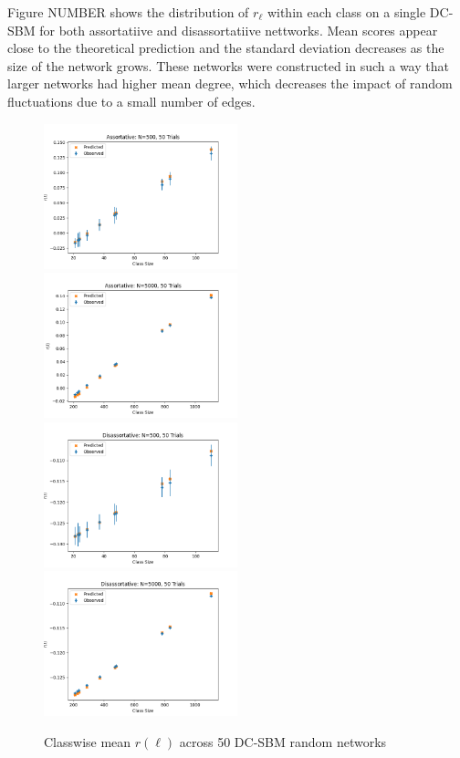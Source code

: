 \documentclass[12pt]{article}
\begin{document}
Figure NUMBER shows the distribution of $r_\ell$ within each class on a single DC-SBM for both assortatiive and disassortatiive nettworks.  Mean scores appear close to the theoretical prediction and the standard deviation decreases as the size of the network grows.  These networks were constructed in such a way that larger networks had higher mean degree, which decreases the impact of random fluctuations due to a small number of edges.  

\begin{figure}[h!]
\includegraphics[width=0.5\textwidth]{assortative_N_500_trials_50.png}
\includegraphics[width=0.5\textwidth]{assortative_N_5000_trials_50.png}
\includegraphics[width=0.5\textwidth]{disassortative_N_500_trials_50.png}
\includegraphics[width=0.5\textwidth]{disassortative_N_5000_trials_50.png}
\caption{Classwise mean $r(\ell)$ across 50 DC-SBM random networks}
\end{figure}
\end{document}
